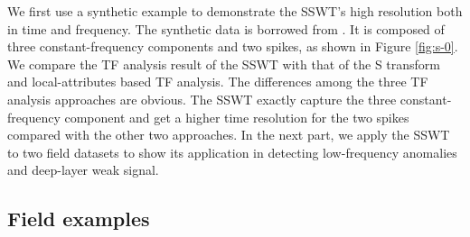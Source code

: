 

We first use a synthetic example to demonstrate the SSWT's high resolution both in time and frequency. The synthetic data is borrowed from \cite{guochang20112}. It is composed of three constant-frequency components and two spikes, as shown in Figure \ref{fig:s-0}. We compare the TF analysis result of the SSWT with that of the S transform and local-attributes based TF analysis.  %
The differences among the three TF analysis approaches are obvious. The SSWT exactly capture the three constant-frequency component and get a higher time resolution for the two spikes compared with the other two approaches. In the next part, we apply the SSWT to two field datasets to show its application in detecting low-frequency anomalies and deep-layer weak signal.

\subsection{Field examples}




